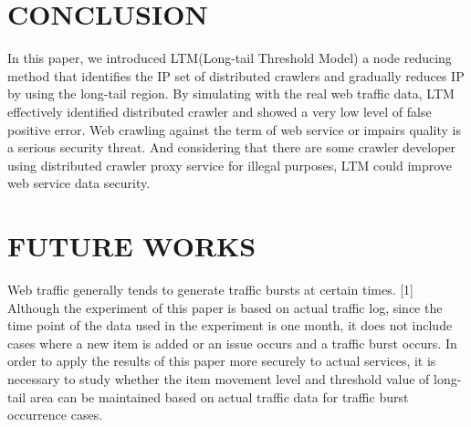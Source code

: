 \documentclass[sigconf,anonymous=true]{acmart}
\begin{document}
%
%
\section{CONCLUSION}
In this paper, we introduced LTM(Long-tail Threshold Model) a node reducing method that identifies the IP set of distributed crawlers and gradually reduces IP by using the long-tail region.
By simulating with the real web traffic data, LTM effectively identified distributed crawler and showed a very low level of false positive error.
Web crawling against the term of web service or impairs quality is a serious security threat. And considering that there are some crawler developer using distributed crawler proxy service for illegal purposes, LTM could improve web service data security.


%
%
\section{FUTURE WORKS}
Web traffic generally tends to generate traffic bursts at certain times. [1] Although the experiment of this paper is based on actual traffic log, since the time point of the data used in the experiment is one month, it does not include cases where a new item is added or an issue occurs and a traffic burst occurs.
In order to apply the results of this paper more securely to actual services, it is necessary to study whether the item movement level and threshold value of long-tail area can be maintained based on actual traffic data for traffic burst occurrence cases.



\nocite{*}


\end{document}
